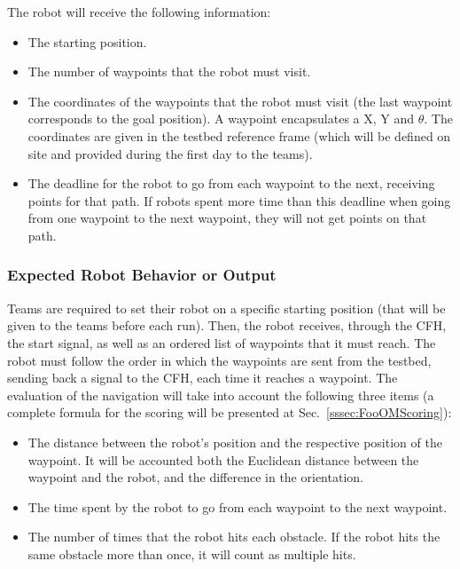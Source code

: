 The robot will receive the following information:
\begin{itemize}
  \item{The starting position.}
  \item{The number of waypoints that the robot must visit.}
  \item{The coordinates of the waypoints that the robot must visit (the last waypoint corresponds to the goal position). A waypoint encapsulates a X, Y and $\theta$. The coordinates are given in the testbed reference frame (which will be defined on site and provided during the first day to the teams).}
  \item{The deadline for the robot to go from each waypoint to the next, receiving points for that path. If robots spent more time than this deadline when going from one waypoint to the next waypoint, they will not get points on that path.}%
\end{itemize}

\subsubsection{Expected Robot Behavior or Output}
\label{sssec:FooOMOutput}

Teams are required to set their robot on a specific starting position (that will be given to the teams before each run). Then, the robot receives, through the CFH, the start signal, as well as an ordered list of waypoints that it must reach. The robot must follow the order in which the waypoints are sent from the testbed, sending back a signal to the CFH, each time it reaches a waypoint. The evaluation of the navigation will take into account the following three items (a complete formula for the scoring will be presented at Sec.~\ref{sssec:FooOMScoring}):
\begin{itemize}
  \item The distance between the robot's position and the respective position of the waypoint. It will be accounted both the Euclidean distance between the waypoint and the robot, and the difference in the orientation.
  \item The time spent by the robot to go from each waypoint to the next waypoint. 
  \item The number of times that the robot hits each obstacle. If the robot hits the same obstacle more than once, it will count as multiple hits.
\end{itemize}

